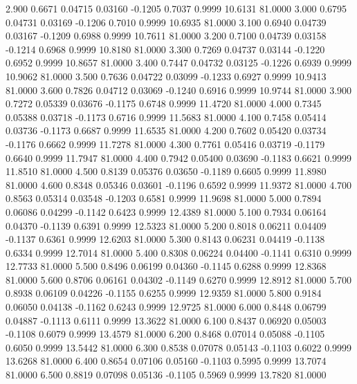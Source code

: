    2.900   0.6671   0.04715   0.03160  -0.1205   0.7037   0.9999  10.6131  81.0000
   3.000   0.6795   0.04731   0.03169  -0.1206   0.7010   0.9999  10.6935  81.0000
   3.100   0.6940   0.04739   0.03167  -0.1209   0.6988   0.9999  10.7611  81.0000
   3.200   0.7100   0.04739   0.03158  -0.1214   0.6968   0.9999  10.8180  81.0000
   3.300   0.7269   0.04737   0.03144  -0.1220   0.6952   0.9999  10.8657  81.0000
   3.400   0.7447   0.04732   0.03125  -0.1226   0.6939   0.9999  10.9062  81.0000
   3.500   0.7636   0.04722   0.03099  -0.1233   0.6927   0.9999  10.9413  81.0000
   3.600   0.7826   0.04712   0.03069  -0.1240   0.6916   0.9999  10.9744  81.0000
   3.900   0.7272   0.05339   0.03676  -0.1175   0.6748   0.9999  11.4720  81.0000
   4.000   0.7345   0.05388   0.03718  -0.1173   0.6716   0.9999  11.5683  81.0000
   4.100   0.7458   0.05414   0.03736  -0.1173   0.6687   0.9999  11.6535  81.0000
   4.200   0.7602   0.05420   0.03734  -0.1176   0.6662   0.9999  11.7278  81.0000
   4.300   0.7761   0.05416   0.03719  -0.1179   0.6640   0.9999  11.7947  81.0000
   4.400   0.7942   0.05400   0.03690  -0.1183   0.6621   0.9999  11.8510  81.0000
   4.500   0.8139   0.05376   0.03650  -0.1189   0.6605   0.9999  11.8980  81.0000
   4.600   0.8348   0.05346   0.03601  -0.1196   0.6592   0.9999  11.9372  81.0000
   4.700   0.8563   0.05314   0.03548  -0.1203   0.6581   0.9999  11.9698  81.0000
   5.000   0.7894   0.06086   0.04299  -0.1142   0.6423   0.9999  12.4389  81.0000
   5.100   0.7934   0.06164   0.04370  -0.1139   0.6391   0.9999  12.5323  81.0000
   5.200   0.8018   0.06211   0.04409  -0.1137   0.6361   0.9999  12.6203  81.0000
   5.300   0.8143   0.06231   0.04419  -0.1138   0.6334   0.9999  12.7014  81.0000
   5.400   0.8308   0.06224   0.04400  -0.1141   0.6310   0.9999  12.7733  81.0000
   5.500   0.8496   0.06199   0.04360  -0.1145   0.6288   0.9999  12.8368  81.0000
   5.600   0.8706   0.06161   0.04302  -0.1149   0.6270   0.9999  12.8912  81.0000
   5.700   0.8938   0.06109   0.04226  -0.1155   0.6255   0.9999  12.9359  81.0000
   5.800   0.9184   0.06050   0.04138  -0.1162   0.6243   0.9999  12.9725  81.0000
   6.000   0.8448   0.06799   0.04887  -0.1113   0.6111   0.9999  13.3622  81.0000
   6.100   0.8437   0.06920   0.05003  -0.1108   0.6079   0.9999  13.4579  81.0000
   6.200   0.8468   0.07014   0.05088  -0.1105   0.6050   0.9999  13.5442  81.0000
   6.300   0.8538   0.07078   0.05143  -0.1103   0.6022   0.9999  13.6268  81.0000
   6.400   0.8654   0.07106   0.05160  -0.1103   0.5995   0.9999  13.7074  81.0000
   6.500   0.8819   0.07098   0.05136  -0.1105   0.5969   0.9999  13.7820  81.0000
